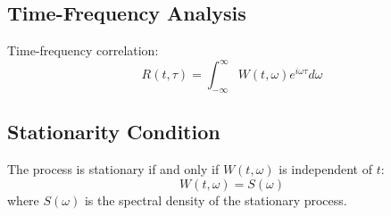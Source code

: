 \documentclass{article}
\begin{document}
\subsection{Time-Frequency Analysis}
Time-frequency correlation:
\begin{equation}
R(t,\tau) = \int_{-\infty}^{\infty} W(t,\omega) e^{i\omega\tau} d\omega
\end{equation}
\subsection{Stationarity Condition}
The process is stationary if and only if $W(t,\omega)$ is independent of $t$:
\begin{equation}
W(t,\omega) = S(\omega)
\end{equation}
where $S(\omega)$ is the spectral density of the stationary process.
\end{document}
